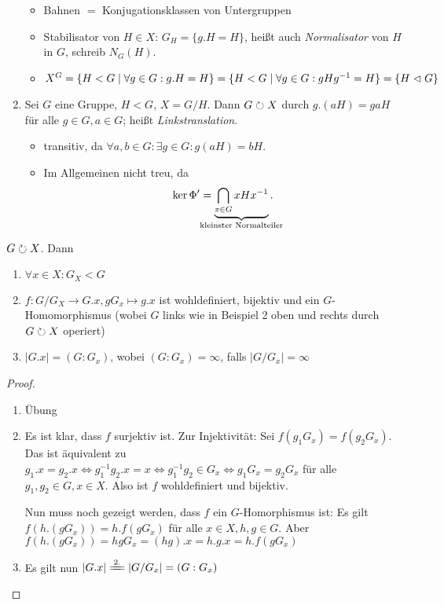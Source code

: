 \documentclass[12pt,a4paper]{scrartcl}
\begin{document}
\begin{bsp}
\begin{enumerate}
		\begin{itemize}[itemsep=-3pt]
			\item Bahnen $=$ Konjugationsklassen von Untergruppen
			\item Stabilisator von $H\in X$: $G_H = \{ g.H = H \}$, heißt auch \emph{Normalisator} von $H$ in $G$, schreib $N_G(H)$.
			\item $X^G = \{ H < G \mid \forall g \in G: g.H = H \}=\{ H < G \mid \forall g \in G: gHg^{-1} = H \} = \{H \vartriangleleft G \}$
		\end{itemize}
		\item Sei $G$ eine Gruppe, $H < G$, $X = G/H$. Dann $G \circlearrowright X$ durch $g.(aH) = gaH$ für alle $g\in G, a \in G$; heißt \emph{Linkstranslation}. \label{bsp:linkstrans}
		\begin{itemize}[itemsep=-3pt]
			\item transitiv, da $\forall a,b \in G: \exists g \in G: g(aH)=bH$.
			\item Im Allgemeinen nicht treu, da \[\ker\Phi' = \underbrace{\bigcap_{x \in G}xHx^{-1}}_{\mathclap{\text{kleinster Normalteiler}}}.\]
		\end{itemize}
	\end{enumerate}
\end{bsp}

\begin{lem}
	$G\circlearrowright X$. Dann
	\begin{enumerate}
		\item $\forall x\in X: G_X<G$
		\item $f\colon G/G_X\to G.x, gG_x\mapsto g.x$ ist wohldefiniert, bijektiv und ein $G$-Homomorphismus (wobei $G$ links wie in Beispiel 2 oben und rechts durch $G\circlearrowright X$ operiert)
		\item $|G.x| = (G:G_x)$, wobei $(G:G_x) = \infty$, falls $|G/G_x |=\infty$
	\end{enumerate}
\end{lem}

\begin{proof}
	\leavevmode
	\begin{enumerate}
		\item Übung
		\item Es ist klar, dass $f$ surjektiv ist. Zur Injektivität: Sei $f(g_1G_x) = f(g_2G_x)$. Das ist äquivalent zu $ g_1.x = g_2.x\Leftrightarrow g_1^{-1}g_2.x = x \Leftrightarrow g_1^{-1}g_2\in G_x \Leftrightarrow g_1G_x = g_2G_x$ für alle $g_1,g_2 \in G, x\in X$. Also ist $f$ wohldefiniert und bijektiv.
		
		Nun muss noch gezeigt werden, dass $f$ ein $G$-Homorphismus ist: Es gilt $f(h.(gG_x)) = h.f(gG_x)$ für alle $x\in X, h,g\in G$. Aber $f(h.(gG_x)) = hgG_x = (hg).x = h.g.x = h.f(gG_x)$
		\item Es gilt nun $|G.x|\xeq{2.} |G/G_x| = (G:G_x)$
	\end{enumerate}
\end{proof}
\end{document}
